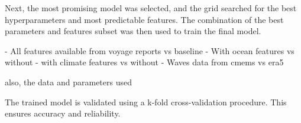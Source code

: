 Next, the most promising model was selected, and the grid searched for the best hyperparameters and most predictable features. The combination of the best parameters and features subset was then used to train the final model.

- All features available from voyage reports vs baseline 
- With ocean features vs without 
- with climate features vs without 
- Waves data from cmems vs era5 

also, the data and parameters used 

The trained model is validated using a k-fold cross-validation procedure. This ensures accuracy and reliability.